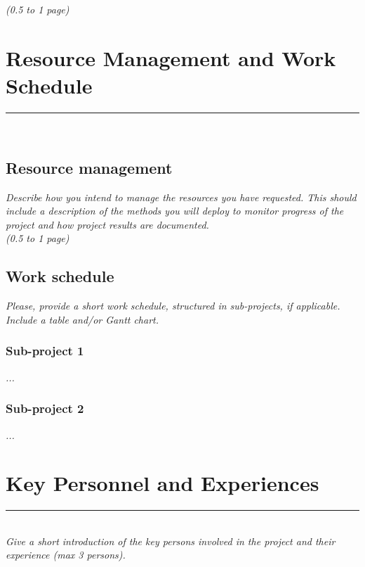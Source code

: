 \documentclass [a4paper, 12pt]{article}
\begin{document}
\textit{(0.5 to 1 page)}

\section{Resource Management and Work Schedule}
\rule{\textwidth}{0.4pt}\\
\subsection{Resource management}
\textit{Describe how you intend to manage the resources you have requested. This should include a description of the methods you will deploy to monitor progress of the project and how project results are documented.}\\

\textit{(0.5 to 1 page)}

\subsection{Work schedule}
\textit{Please, provide a short work schedule, structured in sub-projects, if applicable. Include a table and/or Gantt chart.}

\subsubsection{Sub-project 1}
\textit{...}

\subsubsection{Sub-project 2}
\textit{...}\\

\bigskip

\section{Key Personnel and Experiences}
\rule{\textwidth}{0.4pt}\\
\textit{Give a short introduction of the key persons involved in the project and their experience (max 3 persons).}\\
\end{document}
